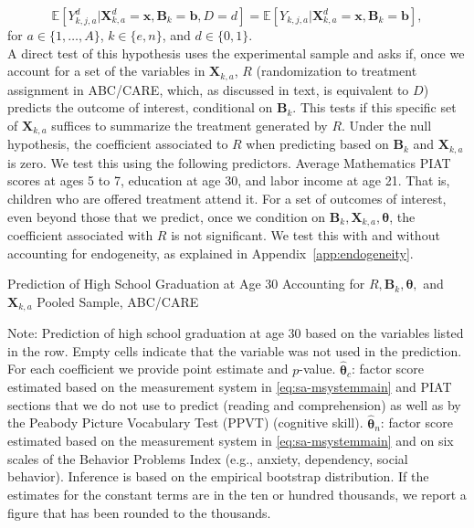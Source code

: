 \begin{equation}\label{eq:invariancetestapp}
\mathbb{E} \left[ Y_{k,j,a}^d | \bm{X}_{k,a}^d  = \bm{x}, \bm{B}_k = \bm{b}, D = d \right] = \mathbb{E} \left[ Y_{k,j,a} | \bm{X}^d_{k,a}  = \bm{x}, \bm{B}_k = \bm{b} \right],
\end{equation}
for $a \in \{1,\dots,A\}$, $k \in \{e,n\}$, and $d \in \{0,1\}$.\\

\noindent A direct test of this hypothesis uses the experimental sample and asks if, once we account for a set of the variables in $\bm{X}_{k,a}$, $R$ (randomization to treatment assignment in ABC/CARE, which, as discussed in text, is equivalent to $D$) predicts the outcome of interest, conditional on $\bm{B}_k$. This tests if this specific set of $\bm{X}_{k,a}$ suffices to summarize the treatment generated by $R$. Under the null hypothesis, the coefficient associated to $R$ when predicting based on $\bm{B}_k$ and $\bm{X}_{k,a}$ is zero. We test this using the following predictors. Average Mathematics PIAT scores at ages 5 to 7, education at age 30, and labor income at age 21. That is, children who are offered treatment attend it. For a set of outcomes of interest, even beyond those that we predict, once we condition on $\bm{B}_k, \bm{X}_{k,a}, \bm{\theta}$, the coefficient associated with $R$ is not significant. We test this with and without accounting for endogeneity, as explained in Appendix~\ref{app:endogeneity}.\\

\begin{table}
\begin{threeparttable}
\caption{Prediction of High School Graduation at Age 30 Accounting for $R, \bm{B}_k, \bm{\theta},$ and $\bm{X}_{k,a}$ Pooled Sample, ABC/CARE}
\label{table:end2}
\centering
\scriptsize

\begin{tablenotes}
\footnotesize
\item Note: Prediction of high school graduation at age 30 based on the variables listed in the row. Empty cells indicate that the variable was not used in the prediction. For each coefficient we provide point estimate and $p$-value. $\hat{\bm{\theta}}_{c}$: factor score estimated based on the measurement system in \eqref{eq:sa-msystemmain} and PIAT sections that we do not use to predict (reading and comprehension) as well as by the Peabody Picture Vocabulary Test (PPVT) (cognitive skill). $\hat{\bm{\theta}}_{n}$: factor score estimated based on the measurement system in \eqref{eq:sa-msystemmain} and on six scales of the Behavior Problems Index (e.g., anxiety, dependency, social behavior). Inference is based on the empirical bootstrap distribution. If the estimates for the constant terms are in the ten or hundred thousands, we report a figure that has been rounded to the thousands.
\end{tablenotes}
\end{threeparttable}
\end{table}

